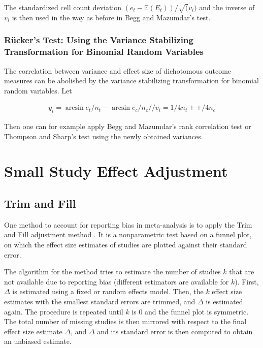 \documentclass[11pt,a4paper,twoside]{book}\usepackage[]{graphicx}\usepackage[]{color}
\begin{document}
\vspace{0mm}
The standardized cell count deviation $(e_{t} - \mathbb{E}(E_{t}))/\sqrt(v_{i})$ and the inverse of $v_{i}$ is then used in the way as before in Begg and Mazumdar's test.

\subsubsection{R\"ucker's Test: Using the Variance Stabilizing Transformation for Binomial Random Variables}
The correlation between variance and effect size of dichotomous outcome measures can be abolished by the variance stabilizing transformation for binomial random variables. Let 

\begin{align}
y_{i} = \arcsin{e_{t}/n_{t}} - \arcsin{e_{c}/n_{c}}// 
v_{i} = 1/4n_{t} + +/4n_{c}
\end{align}

Then one can for example apply Begg and Mazumdar's rank correlation test or Thompson and Sharp's test using the newly obtained variances. 


\section{Small Study Effect Adjustment}
\subsection{Trim and Fill}
One method to account for reporting bias in meta-analysis is to apply the Trim and Fill adjustment method \citep{trimfill}. It is a nonparametric test based on a funnel plot, on which the effect size estimates of studies are plotted against their standard error. 

\vspace{0mm}
The algorithm for the method tries to estimate the number of studies $k$ that are not available due to reporting bias (different estimators are available for $k$). First, $\Delta$ is estimated using a fixed or random effects model. Then, the $k$ effect size estimates with the smallest standard errors are trimmed, and $\Delta$ is estimated again. The procedure is repeated until $k$ is 0 and the funnel plot is symmetric. The total number of missing studies is then mirrored with respect to the final effect size estimate $\Delta$, and $\Delta$ and its standard error is then computed to obtain an unbiased estimate.
\end{document}
